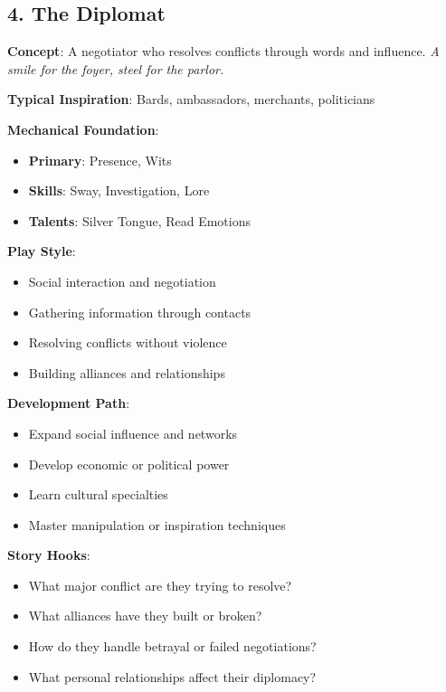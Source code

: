 \begin{multicols}{2}
\section{4. The Diplomat}

\textbf{Concept}: A negotiator who resolves conflicts through words and influence. \emph{A smile for the foyer, steel for the parlor.}

\textbf{Typical Inspiration}: Bards, ambassadors, merchants, politicians

\textbf{Mechanical Foundation}:
\begin{itemize}
\item \textbf{Primary}: Presence, Wits
\item \textbf{Skills}: Sway, Investigation, Lore
\item \textbf{Talents}: Silver Tongue, Read Emotions
\end{itemize}

\textbf{Play Style}:
\begin{itemize}
\item Social interaction and negotiation
\item Gathering information through contacts
\item Resolving conflicts without violence
\item Building alliances and relationships
\end{itemize}

\textbf{Development Path}:
\begin{itemize}
\item Expand social influence and networks
\item Develop economic or political power
\item Learn cultural specialties
\item Master manipulation or inspiration techniques
\end{itemize}

\textbf{Story Hooks}:
\begin{itemize}
\item What major conflict are they trying to resolve?
\item What alliances have they built or broken?
\item How do they handle betrayal or failed negotiations?
\item What personal relationships affect their diplomacy?
\end{itemize}


\end{multicols}
